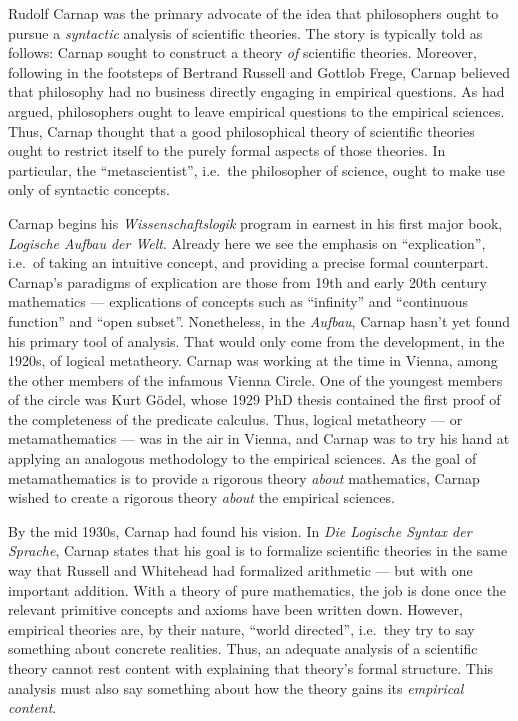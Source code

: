 Rudolf Carnap was the primary advocate of the idea that philosophers
ought to pursue a {\it syntactic} analysis of scientific theories.
The story is typically told as follows: Carnap sought to construct a
theory {\it of} scientific theories.  Moreover, following in the
footsteps of Bertrand Russell and Gottlob Frege, Carnap believed that
philosophy had no business directly engaging in empirical questions.
As \cite{russ} had argued, philosophers ought to leave empirical
questions to the empirical sciences.  Thus, Carnap thought that a good
philosophical theory of scientific theories ought to restrict itself
to the purely formal aspects of those theories.  In particular, the
``metascientist'', i.e.\ the philosopher of science, ought to make use
only of syntactic concepts.

Carnap begins his {\it Wissenschaftslogik} program in earnest in his
first major book, {\it Logische Aufbau der Welt}.  Already here we see
the emphasis on ``explication'', i.e.\ of taking an intuitive concept,
and providing a precise formal counterpart.  Carnap's paradigms of
explication are those from 19th and early 20th century mathematics ---
explications of concepts such as ``infinity'' and ``continuous
function'' and ``open subset''.  Nonetheless, in the {\it Aufbau},
Carnap hasn't yet found his primary tool of analysis.  That would only
come from the development, in the 1920s, of logical metatheory.
Carnap was working at the time in Vienna, among the other members of
the infamous Vienna Circle.  One of the youngest members of the circle
was Kurt G{\"o}del, whose 1929 PhD thesis contained the first proof of
the completeness of the predicate calculus.  Thus, logical metatheory
--- or metamathematics --- was in the air in Vienna, and Carnap was to
try his hand at applying an analogous methodology to the empirical
sciences.  As the goal of metamathematics is to provide a rigorous
theory {\it about} mathematics, Carnap wished to create a rigorous
theory {\it about} the empirical sciences.

By the mid 1930s, Carnap had found his vision.  In {\it Die Logische
  Syntax der Sprache}, Carnap states that his goal is to formalize
scientific theories in the same way that Russell and Whitehead had
formalized arithmetic --- but with one important addition.  With a
theory of pure mathematics, the job is done once the relevant
primitive concepts and axioms have been written down.  However,
empirical theories are, by their nature, ``world directed'', i.e.\
they try to say something about concrete realities.  Thus, an adequate
analysis of a scientific theory cannot rest content with explaining
that theory's formal structure.  This analysis must also say something
about how the theory gains its {\it empirical content}.

